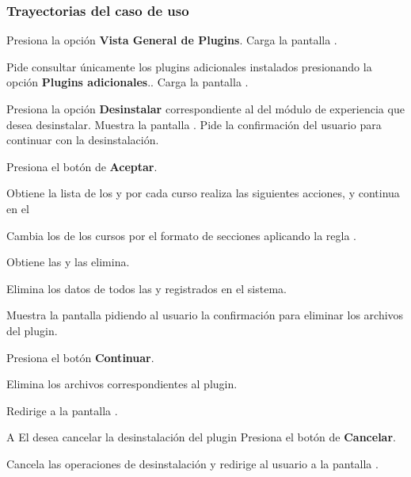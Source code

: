 \subsubsection{Trayectorias del caso de uso}

\begin{UCtrayectoria}%
%
  \Actor Presiona la opción {\bf Vista General de Plugins}.
  \Sistema Carga la pantalla .

  \Actor Pide consultar únicamente los plugins adicionales instalados presionando
         la opción {\bf Plugins adicionales}..
  \Sistema Carga la pantalla .

  \Actor Presiona la opción {\bf Desinstalar} correspondiente al
          del módulo de experiencia que desea desinstalar.
  \Sistema Muestra la pantalla .
  \Sistema Pide la confirmación del usuario para continuar con la desinstalación.

  \Actor Presiona el botón de {\bf Aceptar}. 

  \Sistema Obtiene la lista de los  y por cada curso
           realiza las siguientes acciones, y continua en el \label{CU-E03-loop-delete-course}

  \Sistema Cambia los  de los cursos por el formato de
           secciones aplicando la regla .

  \Sistema Obtiene las 
           y las elimina.

  \Sistema Elimina los datos de todos las  y 
           registrados en el sistema.

  \Sistema Muestra la pantalla  pidiendo al usuario la confirmación
           para eliminar los archivos del plugin.

  \Actor Presiona el botón {\bf Continuar}. 


  \Sistema Elimina los archivos correspondientes al plugin.

  \Sistema Redirige a la pantalla .

\end{UCtrayectoria}

\begin{UCtrayectoriaA}{A}{%
El  desea cancelar la desinstalación del plugin
}
  \Actor Presiona el botón de {\bf Cancelar}.

  \Sistema Cancela las operaciones de desinstalación y redirige al usuario a la
           pantalla .
\end{UCtrayectoriaA}

